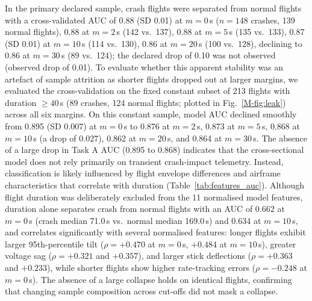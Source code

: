 \documentclass[preprint,12pt]{elsarticle}
\begin{document}
In the primary declared sample, crash flights were separated from normal flights with a cross-validated AUC of 0.88
(SD 0.01) at $m=0$\,s ($n=148$ crashes, 139 normal flights), 0.88 at $m=2$\,s (142 vs.\ 137), 0.88 at $m=5$\,s (135 vs.\ 133),
0.87 (SD 0.01) at $m=10$\,s (114 vs.\ 130), 0.86 at $m=20$\,s (100 vs.\ 128), declining to 0.86 at $m=30$\,s (89 vs.\ 124);
the declared drop of 0.10 was not observed (observed drop of 0.01). To evaluate whether this apparent stability was an artefact of sample attrition as shorter
flights dropped out at larger margins, we evaluated the cross-validation on the fixed constant subset of 213 flights
with duration $\ge 40$\,s (89 crashes, 124 normal flights; plotted in Fig.~\ref{M-fig:leak}) across all six margins. On this
constant sample, model AUC declined smoothly from 0.895 (SD 0.007) at $m=0$\,s to 0.876 at $m=2$\,s, 0.873 at $m=5$\,s,
0.868 at $m=10$\,s (a drop of 0.027), 0.862 at $m=20$\,s, and 0.864 at $m=30$\,s. The absence of a large drop in Task A AUC (0.895 to 0.868)
indicates that the cross-sectional model does not rely primarily on transient crash-impact telemetry. Instead, classification is likely
influenced by flight envelope differences and airframe characteristics that correlate with duration (Table~\ref{tab:features_auc}).
Although flight duration was deliberately excluded from the 11 normalised model features, duration alone separates crash from normal flights
with an AUC of 0.662 at $m=0$\,s (crash median 71.0\,s vs.\ normal median 169.0\,s) and 0.634 at $m=10$\,s, and correlates significantly with
several normalised features: longer flights exhibit larger 95th-percentile tilt ($\rho=+0.470$ at $m=0$\,s, $+0.484$ at $m=10$\,s), greater
voltage sag ($\rho=+0.321$ and $+0.357$), and larger stick deflections ($\rho=+0.363$ and $+0.233$), while shorter flights show higher rate-tracking
errors ($\rho=-0.248$ at $m=0$\,s). The absence of a large collapse holds on identical flights, confirming that changing sample composition
across cut-offs did not mask a collapse.
\end{document}
